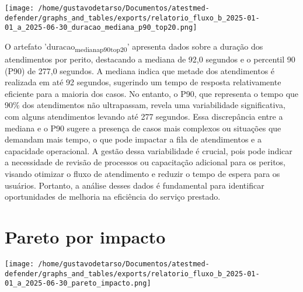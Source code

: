 \documentclass[11pt]{article}
\begin{document}
\begin{center}
\texttt{[image: /home/gustavodetarso/Documentos/atestmed-defender/graphs\_and\_tables/exports/relatorio\_fluxo\_b\_2025-01-01\_a\_2025-06-30\_duracao\_mediana\_p90\_top20.png]}
\end{center}
O artefato 'duracao\textsubscript{mediana}\textsubscript{p90}\textsubscript{top20}' apresenta dados sobre a duração dos atendimentos por perito, destacando a mediana de 92,0 segundos e o percentil 90 (P90) de 277,0 segundos. A mediana indica que metade dos atendimentos é realizada em até 92 segundos, sugerindo um tempo de resposta relativamente eficiente para a maioria dos casos. No entanto, o P90, que representa o tempo que 90\% dos atendimentos não ultrapassam, revela uma variabilidade significativa, com alguns atendimentos levando até 277 segundos. Essa discrepância entre a mediana e o P90 sugere a presença de casos mais complexos ou situações que demandam mais tempo, o que pode impactar a fila de atendimentos e a capacidade operacional. A gestão dessa variabilidade é crucial, pois pode indicar a necessidade de revisão de processos ou capacitação adicional para os peritos, visando otimizar o fluxo de atendimento e reduzir o tempo de espera para os usuários. Portanto, a análise desses dados é fundamental para identificar oportunidades de melhoria na eficiência do serviço prestado.

\section{Pareto por impacto}
\label{sec:org66066af}
\begin{center}
\texttt{[image: /home/gustavodetarso/Documentos/atestmed-defender/graphs\_and\_tables/exports/relatorio\_fluxo\_b\_2025-01-01\_a\_2025-06-30\_pareto\_impacto.png]}
\end{center}
\end{document}
